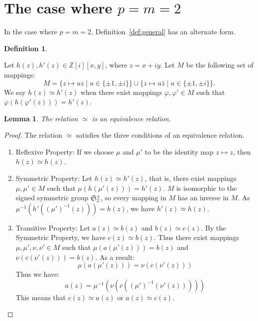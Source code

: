 \documentclass[12pt]{article}
\newtheorem{lemma}[theorem]{Lemma}
\theoremstyle{definition}
\newtheorem{definition}[theorem]{Definition}
\newcommand{\Zzz}{\mathbb Z}
\numberwithin{equation}{section}
\begin{document}
\section{The case where \( p = m = 2\)}


In the case where \( p = m = 2\), Definition~\ref{def:general} has an alternate form.



\begin{definition}
\label{def:2D}

Let \( h(z), h'(z) \in \Zzz [i][x,y] \),
where \( z = x + iy \).
Let \( M \) be the following set of mappings: 
\[
M = \{ z \mapsto uz \mid u \in \{ \pm 1, \pm i \} \}  
\cup \{ z\mapsto u \bar{z} \mid u \in \{ \pm 1, \pm i \} \}.  
\]
We say \( h(z) \simeq h'(z) \) when there exist mappings \( \varphi, \varphi' \in M \)
such that \( \varphi( h( \varphi'( z ) ) )  = h'(z) \).


\end{definition}

\begin{lemma}
The relation \( \simeq \) is an equivalence relation.
\end{lemma}

\begin{proof}
The relation \( \simeq \) satisfies the three conditions of an equivalence relation.
\begin{enumerate}
\item Reflexive Property: If we choose \( \mu \) and \( \mu'\) to be the identity map \( z \mapsto z \), 
then \( h(z) \simeq h(z) \).

\item Symmetric Property: Let  \( h(z) \simeq h'(z) \), that is, there exist mappings 
\( \mu, \mu' \in M \)
such that \( \mu( h( \mu'( z ) ) )  = h'(z) \).
\(M\) is isomorphic to the signed symmetric group \( \mathfrak{S}_2^\pm \), so every mapping in \(M\)
has an inverse in \(M\). As  \( \mu^{-1}( h'( (\mu')^{-1}( z ) ) )  = h(z) \),
we have \( h'(z) \simeq h(z) \).

\item Transitive Property: Let \( a(z) \simeq b(z) \) and \( b(z) \simeq c(z) \). By the 
Symmetric Property, we have \( c(z) \simeq b(z) \). Thus there exist mappings
\( \mu, \mu', \nu, \nu' \in M \) such that \( \mu( a( \mu'( z ) ) )  = b(z) \) and 
\( \nu( c( \nu'( z ) ) )  = b(z) \). As a result:
\[
\mu( a( \mu'( z ) ) ) = \nu( c( \nu'( z ) ) )  
\]
Thus we have: 
\[
a(  z  ) = \mu^{-1}( \nu( c( (\mu')^{-1}( \nu'( z ) ) ) ) )
\]
This means that \( c(z) \simeq a(z) \) or \( a(z) \simeq c(z) \).
\end{enumerate}
\end{proof}
\end{document}
